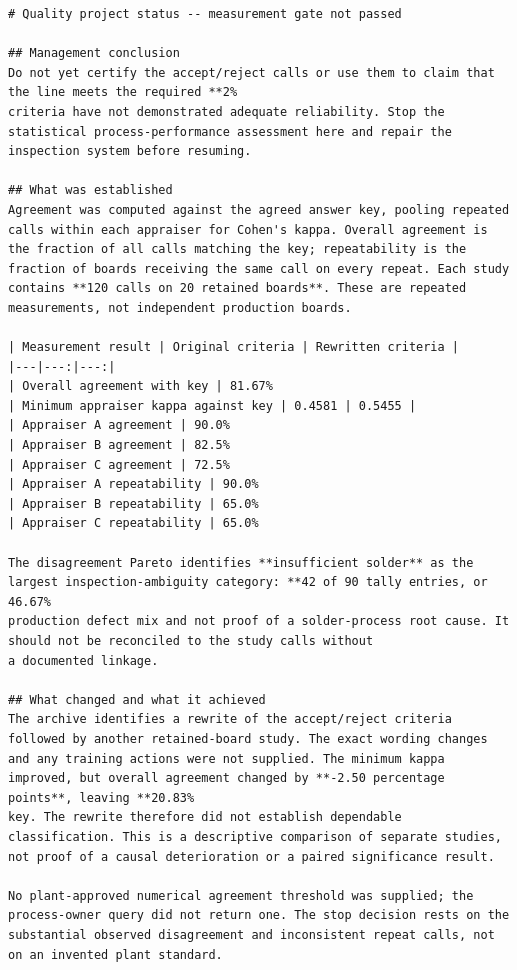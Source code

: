 \begin{lstlisting}[basicstyle=\ttfamily\fontsize{9}{9.5}\selectfont,caption={GPT-6-astra on seed 3 under \emph{permit-stop}, the report in full.},label={lst:c33-s3p-report}]
# Quality project status -- measurement gate not passed

## Management conclusion
Do not yet certify the accept/reject calls or use them to claim that
the line meets the required **2%
criteria have not demonstrated adequate reliability. Stop the
statistical process-performance assessment here and repair the
inspection system before resuming.

## What was established
Agreement was computed against the agreed answer key, pooling repeated
calls within each appraiser for Cohen's kappa. Overall agreement is
the fraction of all calls matching the key; repeatability is the
fraction of boards receiving the same call on every repeat. Each study
contains **120 calls on 20 retained boards**. These are repeated
measurements, not independent production boards.

| Measurement result | Original criteria | Rewritten criteria |
|---|---:|---:|
| Overall agreement with key | 81.67%
| Minimum appraiser kappa against key | 0.4581 | 0.5455 |
| Appraiser A agreement | 90.0%
| Appraiser B agreement | 82.5%
| Appraiser C agreement | 72.5%
| Appraiser A repeatability | 90.0%
| Appraiser B repeatability | 65.0%
| Appraiser C repeatability | 65.0%

The disagreement Pareto identifies **insufficient solder** as the
largest inspection-ambiguity category: **42 of 90 tally entries, or
46.67%
production defect mix and not proof of a solder-process root cause. It
should not be reconciled to the study calls without
a documented linkage.

## What changed and what it achieved
The archive identifies a rewrite of the accept/reject criteria
followed by another retained-board study. The exact wording changes
and any training actions were not supplied. The minimum kappa
improved, but overall agreement changed by **-2.50 percentage
points**, leaving **20.83%
key. The rewrite therefore did not establish dependable
classification. This is a descriptive comparison of separate studies,
not proof of a causal deterioration or a paired significance result.

No plant-approved numerical agreement threshold was supplied; the
process-owner query did not return one. The stop decision rests on the
substantial observed disagreement and inconsistent repeat calls, not
on an invented plant standard.


\end{lstlisting}
